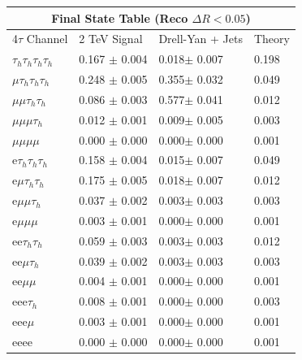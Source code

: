 \documentclass{article}
\begin{document}
 
\begin{landscape} 
\centering 
\begin{tabular}{|p{4.5cm}|p{3cm}|p{3cm}|p{3cm}|}\hline 
\multicolumn{4}{|c|}{Final State Table (Reco \(\Delta R < 0.05\))} \\ 
\hline 
4$\tau$ Channel & 2 TeV Signal & Drell-Yan + Jets & Theory \\ 
\hline 
$\tau_h$$\tau_h$$\tau_h$$\tau_h$ & 0.167 $\pm$ 0.004 & 0.018$\pm$ 0.007 & 0.198\\
\hline 
$\mu$$\tau_h$$\tau_h$$\tau_h$ & 0.248 $\pm$ 0.005 & 0.355$\pm$ 0.032 & 0.049\\
\hline 
$\mu$$\mu$$\tau_h$$\tau_h$ & 0.086 $\pm$ 0.003 & 0.577$\pm$ 0.041 & 0.012\\
\hline 
$\mu$$\mu$$\mu$$\tau_h$ & 0.012 $\pm$ 0.001 & 0.009$\pm$ 0.005 & 0.003\\
\hline 
$\mu$$\mu$$\mu$$\mu$ & 0.000 $\pm$ 0.000 & 0.000$\pm$ 0.000 & 0.001\\
\hline 
e$\tau_h$$\tau_h$$\tau_h$ & 0.158 $\pm$ 0.004 & 0.015$\pm$ 0.007 & 0.049\\
\hline 
e$\mu$$\tau_h$$\tau_h$ & 0.175 $\pm$ 0.005 & 0.018$\pm$ 0.007 & 0.012\\
\hline 
e$\mu$$\mu$$\tau_h$ & 0.037 $\pm$ 0.002 & 0.003$\pm$ 0.003 & 0.003\\
\hline 
e$\mu$$\mu$$\mu$ & 0.003 $\pm$ 0.001 & 0.000$\pm$ 0.000 & 0.001\\
\hline 
ee$\tau_h$$\tau_h$ & 0.059 $\pm$ 0.003 & 0.003$\pm$ 0.003 & 0.012\\
\hline 
ee$\mu$$\tau_h$ & 0.039 $\pm$ 0.002 & 0.003$\pm$ 0.003 & 0.003\\
\hline 
ee$\mu$$\mu$ & 0.004 $\pm$ 0.001 & 0.000$\pm$ 0.000 & 0.001\\
\hline 
eee$\tau_h$ & 0.008 $\pm$ 0.001 & 0.000$\pm$ 0.000 & 0.003\\
\hline 
eee$\mu$ & 0.003 $\pm$ 0.001 & 0.000$\pm$ 0.000 & 0.001\\
\hline 
eeee & 0.000 $\pm$ 0.000 & 0.000$\pm$ 0.000 & 0.001\\
\hline 
\end{tabular} 
\end{landscape} 
\end{document}
